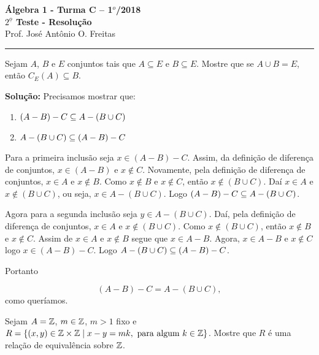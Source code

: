 \documentclass[12pt]{article}
\begin{document}


\begin{center}
{\Large\bf {\'A}lgebra 1 - Turma C -- 1$^{o}$/2018} \\ \vspace{9pt} {\large\bf
  $2^{\underline{o}}$ Teste - Resolu\c{c}\~ao}\\
\vspace{9pt} Prof. Jos{\'e} Ant{\^o}nio O. Freitas
\end{center}
\hrule

\vspace{.6cm}

\questao Sejam $A$, $B$ e $E$ conjuntos tais que $A \subseteq E$ e $B \subseteq E$. Mostre que se $A \cup B = E$, então $C_E(A) \subseteq B$.

\noindent\textbf{Solu\c{c}\~ao:} Precisamos mostrar que:
\begin{enumerate}[label={\roman*})]
	\item $(A - B) - C \subseteq A - (B \cup C)$
	\item $A - (B \cup C) \subseteq (A - B) - C$
\end{enumerate}

Para a primeira inclusão seja $x \in (A - B) - C$. Assim, da definição de diferença de conjuntos, $x \in (A - B)$ e $x \notin C$. Novamente, pela definição de diferença de conjuntos, $x \in A$ e $x \notin B$. Como $x \notin B$ e $x \notin C$, então $x \notin (B \cup C)$. Daí $x \in A$ e $x \notin (B \cup C)$, ou seja, $x \in A - (B \cup C)$. Logo $(A - B) - C \subseteq A - (B \cup C)$.

Agora para a segunda inclusão seja $y \in A - (B \cup C)$. Daí, pela definição de diferença de conjuntos, $x \in A$ e $x \notin (B \cup C)$. Como $x \notin (B \cup C)$, então $x \notin B$ e $x \notin C$. Assim de $x \in A$ e $x \notin B$ segue que $x \in A - B$. Agora, $x \in A - B$ e $x \notin C$ logo $x \in (A - B) - C$. Logo $A - (B \cup C) \subseteq (A - B) - C$.

Portanto

\[
	(A - B) - C = A - (B \cup C),
\]
como queríamos.

\vspace{.5cm}

\questao Sejam $A = \mathbb{Z}$, $m \in \mathbb{Z}$, $m > 1$ fixo e $R = \{(x,y)\in \mathbb{Z} \times \mathbb{Z} \mid x - y = mk, \mbox{ para algum } k \in \mathbb{Z}\}$. Mostre que $R$
é uma rela{\c c}{\~a}o de equival{\^e}ncia sobre $\mathbb{Z}$.
\end{document}
